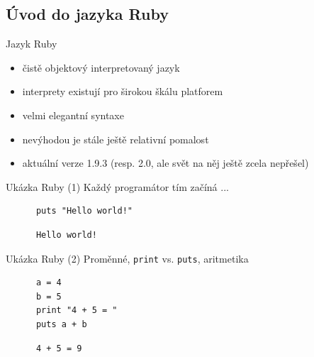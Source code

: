 \documentclass{beamer}
\begin{document}
\subsection{Úvod do jazyka Ruby}

\begin{frame}{Jazyk Ruby}
  \begin{itemize}
    \item čistě objektový interpretovaný jazyk
    \item interprety existují pro širokou škálu platforem
    \item velmi elegantní syntaxe
    \item nevýhodou je stále ještě relativní pomalost
    \item aktuální verze 1.9.3 (resp. 2.0, ale svět na něj ještě zcela nepřešel)
  \end{itemize}
\end{frame}

\begin{frame}[fragile]{Ukázka Ruby (1)}
  Každý programátor tím začíná ...
  \begin{block}{}
    \smallskip \footnotesize
    {\scriptsize \begin{verbatim}
      puts "Hello world!"
    \end{verbatim}}
  \end{block}
  \pause
  \begin{block}{}
    \smallskip \footnotesize
    {\scriptsize \begin{verbatim}
      Hello world!
    \end{verbatim}}
  \end{block}
\end{frame}

\begin{frame}[fragile]{Ukázka Ruby (2)}
  Proměnné, \texttt{print} vs. \texttt{puts}, aritmetika
  \begin{block}{}
    \smallskip \footnotesize
    {\scriptsize \begin{verbatim}
      a = 4
      b = 5
      print "4 + 5 = "
      puts a + b
    \end{verbatim}}
  \end{block}
  \pause
  \begin{block}{}
    \smallskip \footnotesize
    {\scriptsize \begin{verbatim}
      4 + 5 = 9
    \end{verbatim}}
  \end{block}
\end{frame}
\end{document}
